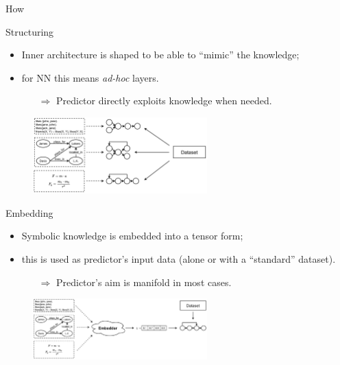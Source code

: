 \documentclass[presentation]{beamer}\mode<presentation>{\usetheme{AMSBolognaFC}}
\begin{document}
\begin{frame}[allowframebreaks]{How}
    \framebreak
    
    \begin{block}{Structuring}
         \begin{itemize}
            \item Inner architecture is shaped to be able to ``mimic'' the knowledge;
            \item for NN this means \emph{ad-hoc} layers.
            \begin{itemize}
                \item[$\Rightarrow$] Predictor directly exploits knowledge when needed.
            \end{itemize} 
        \end{itemize}
        \begin{figure}
            \centering
            \includegraphics[width=0.6\textwidth]{figures/ski-structuring}
        \end{figure}
    \end{block}

    \framebreak
   
    \begin{block}{Embedding}
        \begin{itemize}
            \item Symbolic knowledge is embedded into a tensor form;
            \item this is used as predictor's input data (alone or with a ``standard'' dataset).
            \begin{itemize}
                \item[$\Rightarrow$] Predictor's aim is manifold in most cases.
            \end{itemize} 
        \end{itemize}
        
        \begin{figure}
            \centering
            \includegraphics[width=0.6\textwidth]{figures/ski-embedding}
        \end{figure}
    \end{block}
\end{frame}
\end{document}

